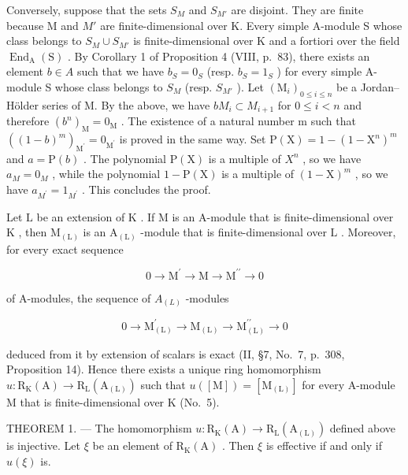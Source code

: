 Conversely, suppose that the sets \(S_{M}\) and \(S_{M'}\) are disjoint. They are finite because M and \(M'\) are finite-dimensional over K. Every simple A-module S whose class belongs to \(S_{M} \cup S_{M'}\) is finite-dimensional over K and a fortiori over the field \(\operatorname{End}_{\mathrm{A}}(\mathrm{S})\) . By Corollary 1 of Proposition 4 (VIII, p.~83), there exists an element \(b \in A\) such that we have \(b_{S} = 0_{S}\) (resp. \(b_{S} = 1_{S}\) ) for every simple A-module S whose class belongs to \(S_{M}\) (resp. \(S_{M'}\) ). Let \((\mathrm{M}_{i})_{0 \leqslant i \leqslant n}\) be a Jordan--Hölder series of M. By the above, we have \(bM_{i} \subset M_{i+1}\) for \(0 \leqslant i < n\) and therefore \((b^{n})_{\mathrm{M}} = 0_{\mathrm{M}}\) . The existence of a natural number m such that \(((1-b)^{m})_{\mathrm{M}^{\prime}}=0_{\mathrm{M}^{\prime}}\) is proved in the same way. Set \(\mathrm{P}(\mathrm{X})=1-(1-\mathrm{X}^{n})^{m}\) and \(a=\mathrm{P}(b)\) . The polynomial \(\mathrm{P}(\mathrm{X})\) is a multiple of \(X^{n}\) , so we have \(a_{M}=0_{M}\) , while the polynomial \(1-\mathrm{P}(\mathrm{X})\) is a multiple of \((1-\mathrm{X})^{m}\) , so we have \(a_{M^{\prime}}=1_{M^{\prime}}\) . This concludes the proof.

Let \(\mathrm{L}\) be an extension of \(\mathrm{K}\) . If \(\mathrm{M}\) is an A-module that is finite-dimensional over \(\mathrm{K}\) , then \(\mathrm{M}_{(\mathrm{L})}\) is an \(\mathrm{A}_{(\mathrm{L})}\) -module that is finite-dimensional over \(\mathrm{L}\) . Moreover, for every exact sequence

\[
0 \longrightarrow \mathrm{M} ^ {\prime} \longrightarrow \mathrm{M} \longrightarrow \mathrm{M} ^ {\prime \prime} \longrightarrow 0
\]

of A-modules, the sequence of \(A_{(L)}\) -modules

\[
0 \longrightarrow \mathrm{M} _ {(\mathrm{L})} ^ {\prime} \longrightarrow \mathrm{M} _ {(\mathrm{L})} \longrightarrow \mathrm{M} _ {(\mathrm{L})} ^ {\prime \prime} \longrightarrow 0
\]

deduced from it by extension of scalars is exact (II, §7, No.~7, p.~308, Proposition 14). Hence there exists a unique ring homomorphism \(u: \mathrm{R}_{\mathrm{K}}(\mathrm{A}) \to \mathrm{R}_{\mathrm{L}}(\mathrm{A}_{(\mathrm{L})})\) such that \(u([\mathrm{M}]) = [\mathrm{M}_{(\mathrm{L})}]\) for every A-module M that is finite-dimensional over K (No.~5).

THEOREM 1. --- The homomorphism \(u: \mathrm{R}_{\mathrm{K}}(\mathrm{A}) \to \mathrm{R}_{\mathrm{L}}(\mathrm{A}_{(\mathrm{L})})\) defined above is injective. Let \(\xi\) be an element of \(\mathrm{R}_{\mathrm{K}}(\mathrm{A})\) . Then \(\xi\) is effective if and only if \(u(\xi)\) is.

